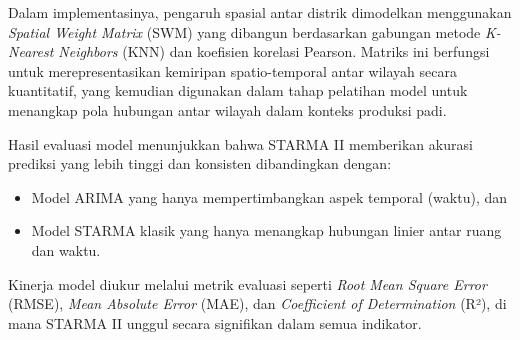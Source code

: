 \begin{enumerate}
    Dalam implementasinya, pengaruh spasial antar distrik dimodelkan menggunakan \textit{Spatial Weight Matrix} (SWM) yang dibangun berdasarkan gabungan metode\textit{ K-Nearest Neighbors} (KNN) dan koefisien korelasi Pearson. Matriks ini berfungsi untuk merepresentasikan kemiripan spatio-temporal antar wilayah secara kuantitatif, yang kemudian digunakan dalam tahap pelatihan model untuk menangkap pola hubungan antar wilayah dalam konteks produksi padi. 
    
    Hasil evaluasi model menunjukkan bahwa STARMA II memberikan akurasi prediksi yang lebih tinggi dan konsisten dibandingkan dengan: 
    \begin{itemize}
        \item Model ARIMA yang hanya mempertimbangkan aspek temporal (waktu), dan 
        \item Model STARMA klasik yang hanya menangkap hubungan linier antar ruang dan waktu. 
    \end{itemize}
    
    Kinerja model diukur melalui metrik evaluasi seperti \textit{Root Mean Square Error} (RMSE), \textit{Mean Absolute Error} (MAE), dan \textit{Coefficient of Determination} (R²), di mana STARMA II unggul secara signifikan dalam semua indikator. 
    

\end{enumerate}
